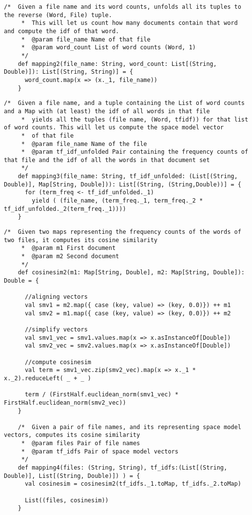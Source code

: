\documentclass{report}
\begin{document}
\begin{lstlisting}[style=scalaHighlight]
    /*  Given a file name and its word counts, unfolds all its tuples to the reverse (Word, File) tuple. 
     *  This will let us count how many documents contain that word and compute the idf of that word.
     *  @param file_name Name of that file
     *  @param word_count List of word counts (Word, 1)
     */
    def mapping2(file_name: String, word_count: List[(String, Double)]): List[(String, String)] = {
      word_count.map(x => (x._1, file_name))
    }
\end{lstlisting}

\begin{lstlisting}[style=scalaHighlight]
/*  Given a file name, and a tuple containing the List of word counts and a Map with (at least) the idf of all words in that file
     *  yields all the tuples (file name, (Word, tfidf)) for that list of word counts. This will let us compute the space model vector
     *  of that file
     *  @param file_name Name of the file
     *  @param tf_idf_unfolded Pair containing the frequency counts of that file and the idf of all the words in that document set
     */
    def mapping3(file_name: String, tf_idf_unfolded: (List[(String, Double)], Map[String, Double])): List[(String, (String,Double))] = {
      for (term_freq <- tf_idf_unfolded._1) 
        yield ( (file_name, (term_freq._1, term_freq._2 * tf_idf_unfolded._2(term_freq._1))))
    }
\end{lstlisting}

\begin{lstlisting}[style=scalaHighlight]
/*  Given two maps representing the frequency counts of the words of two files, it computes its cosine similarity
     *  @param m1 First document
     *  @param m2 Second document
     */
    def cosinesim2(m1: Map[String, Double], m2: Map[String, Double]): Double = {
      
      //aligning vectors
      val smv1 = m2.map({ case (key, value) => (key, 0.0)}) ++ m1
      val smv2 = m1.map({ case (key, value) => (key, 0.0)}) ++ m2
      
      //simplify vectors
      val smv1_vec = smv1.values.map(x => x.asInstanceOf[Double])
      val smv2_vec = smv2.values.map(x => x.asInstanceOf[Double])
      
      //compute cosinesim
      val term = smv1_vec.zip(smv2_vec).map(x => x._1 * x._2).reduceLeft( _ + _ )
      
      term / (FirstHalf.euclidean_norm(smv1_vec) * FirstHalf.euclidean_norm(smv2_vec))
    }
    
    /*  Given a pair of file names, and its representing space model vectors, computes its cosine similarity
     *  @param files Pair of file names
     *  @param tf_idfs Pair of space model vectors
     */
    def mapping4(files: (String, String), tf_idfs:(List[(String, Double)], List[(String, Double)]) ) = {
      val cosinesim = cosinesim2(tf_idfs._1.toMap, tf_idfs._2.toMap)
      
      List((files, cosinesim))
    }
\end{lstlisting}
\end{document}
